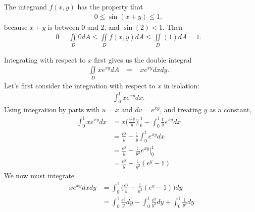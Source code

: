 \documentclass{article}
\begin{document}
\item %
The integrand $f(x,y)$ has the property that 
\begin{align*}
  0 \le \sin(x+y) \le 1,
\end{align*}
because $x+y$ is between 0 and 2, and $\sin(2) < 1$. Then 
\begin{align*}
  0 = \iint\limits_D 0 dA  \le  \iint\limits_D f(x,y) dA \le  \iint\limits_D (1) dA = 1.
\end{align*}
\item %
Integrating with respect to $x$ first gives us the double integral
\begin{align*} 
  \iint\limits_D xe^{xy}dA &=  \mathop{\int_0^1 \!\!\! \int_0^1} xe^{xy} dxdy .
\end{align*}
Let's first consider the integration with respect to $x$ in isolation:
\begin{align*} 
  \int_0^1 xe^{xy} dx  .
  \end{align*}
Using integration by parts with $u=x$ and $dv = e^{xy}$, and treating $y$ as a constant, 
\begin{align*} 
  \int_0^1 xe^{xy} dx  
  &= x\Big(\frac{e^{xy}}{y}\Big)\Big|_0^1 - \int_0^1 \frac{1}{y}e^{xy}dx \\
  &= \frac{e^{y}}{y} -  \frac{1}{y} \int_0^1e^{xy}dx \\
  &= \frac{e^{y}}{y} -  \frac{1}{y^2} e^{xy}\big|_0^1\\
  &= \frac{e^{y}}{y} -  \frac{1}{y^2} (e^{y} - 1)
\end{align*}
We now must integrate 
\begin{align*} 
 \mathop{\int_0^1 \!\!\! \int_0^1} xe^{xy} dxdy &=\int_0^1 \Big(  \frac{e^{y}}{y} -  \frac{1}{y^2} (e^{y} - 1) \Big)dy\\
 &=\int_0^1   \frac{e^{y}}{y} dy - \int_0^1 \frac{e^{y} }{y^2}  dy + \int_0^1 \frac{1}{y^2}   dy
\end{align*}
\end{document}

